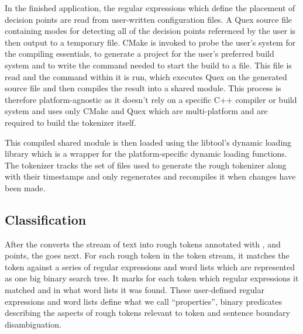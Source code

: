 In the finished application, the regular expressions which define the placement
of decision points are read from user-written configuration files. A Quex
source file containing modes for detecting all of the decision points
referenced by the user is then output to a temporary file. CMake
\cite{web-cmake} is invoked to probe the user's system for the compiling
essentials, to generate a project for the user's preferred build system and to
write the command needed to start the build to a file. This file is read and
the command within it is run, which executes Quex on the generated source file
and then compiles the result into a shared module. This process is therefore
platform-agnostic as it doesn't rely on a specific C++ compiler or build system
and uses only CMake and Quex which are multi-platform and are required to build
the tokenizer itself.

This compiled shared module is then loaded using the libtool's dynamic loading
library \cite{web-libtool} which is a wrapper for the platform-specific dynamic
loading functions. The tokenizer tracks the set of files used to generate the
rough tokenizer along with their timestamps and only regenerates and recompiles
it when changes have been made.

\subsection{Classification}

After the  converts the stream of text into rough tokens
annotated with \maysplit{}, \mayjoin{} and \maybreaksentence{} points, the
 goes next. For each rough token in the token stream,
it matches the token against a series of regular expressions and word lists
which are represented as one big binary search tree. It marks for each token
which regular expressions it matched and in what word lists it was found. These
user-defined regular expressions and word lists define what we call
``properties'', binary predicates describing the aspects of rough tokens
relevant to token and sentence boundary disambiguation.

